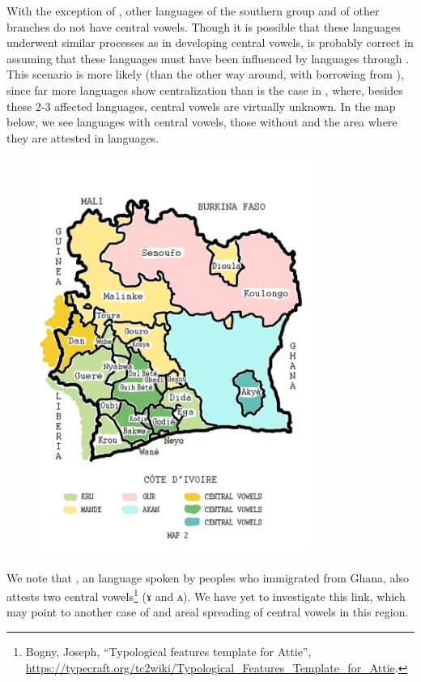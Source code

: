 \documentclass[output=paper
,newtxmath
,modfonts
,nonflat]{langsci/langscibook}
\begin{document}
With the exception of , other languages of the southern  group and of other  branches do not have central vowels.  Though it is possible that these languages underwent similar processes as  in developing central vowels, \citet{Vydrine2009} is probably correct in assuming that these languages must have been influenced by  languages through . This scenario is more likely (than the other way around, with  borrowing from ), since far more  languages show centralization than is the case in , where, besides these 2-3 affected languages, central vowels are virtually unknown.  In the map below, we see  languages with central vowels, those without and the area where they are attested in  languages. 

\begin{figure}
\includegraphics[width=0.8\textwidth]{figures/fig-zogbo-2.png}
\caption{\nocaption}
\end{figure}  

We note that , an  language spoken by peoples who immigrated from Ghana, also attests two central vowels\footnote{Bogny, Joseph, “Typological features template for Attie”, \url{https://typecraft.org/tc2wiki/Typological_Features_Template_for_Attie}.} (ɤ and ʌ).  We have yet to investigate this link, which may point to another case of  and areal spreading of central vowels in this region.
\end{document}
